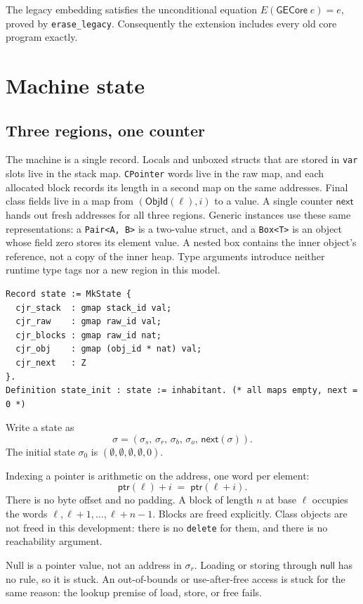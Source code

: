 \documentclass[11pt]{article}
\newcommand{\NULL}{\mathsf{null}}
\begin{document}
The legacy embedding satisfies the unconditional equation
\(E(\mathsf{GECore}\;e)=e\), proved by \texttt{erase\_legacy}.
Consequently the extension includes every old core program exactly.

\section{Machine state}

\subsection{Three regions, one counter}

The machine is a single record.
Locals and unboxed structs that are stored in \texttt{var} slots live in the stack map.
\texttt{CPointer} words live in the raw map, and each allocated block records its length in a second map on the same addresses.
Final class fields live in a map from \((\mathsf{ObjId}(\ell), i)\) to a value.
A single counter \(\mathsf{next}\) hands out fresh addresses for all three regions.
Generic instances use these same representations: a \texttt{Pair<A, B>}
is a two-value struct, and a \texttt{Box<T>} is an object whose field zero
stores its element value. A nested box contains the inner object's reference,
not a copy of the inner heap. Type arguments introduce neither runtime type
tags nor a new region in this model.

\begin{lstlisting}
Record state := MkState {
  cjr_stack  : gmap stack_id val;
  cjr_raw    : gmap raw_id val;
  cjr_blocks : gmap raw_id nat;
  cjr_obj    : gmap (obj_id * nat) val;
  cjr_next   : Z
}.
Definition state_init : state := inhabitant. (* all maps empty, next = 0 *)
\end{lstlisting}

Write a state as
\[
\sigma =
(\sigma_{s},\, \sigma_{r},\, \sigma_{b},\, \sigma_{o},\, \mathsf{next}(\sigma)).
\]
The initial state \(\sigma_0\) is \((\emptyset,\emptyset,\emptyset,\emptyset,0)\).

Indexing a pointer is arithmetic on the address, one word per element:
\[
\mathsf{ptr}(\ell) + i \;=\; \mathsf{ptr}(\ell+i).
\]
There is no byte offset and no padding.
A block of length \(n\) at base \(\ell\) occupies the words \(\ell,\ell+1,\ldots,\ell+n-1\).
Blocks are freed explicitly.
Class objects are not freed in this development: there is no \texttt{delete} for them, and there is no reachability argument.

Null is a pointer value, not an address in \(\sigma_{r}\).
Loading or storing through \(\NULL\) has no rule, so it is stuck.
An out-of-bounds or use-after-free access is stuck for the same reason: the lookup premise of load, store, or free fails.
\end{document}
